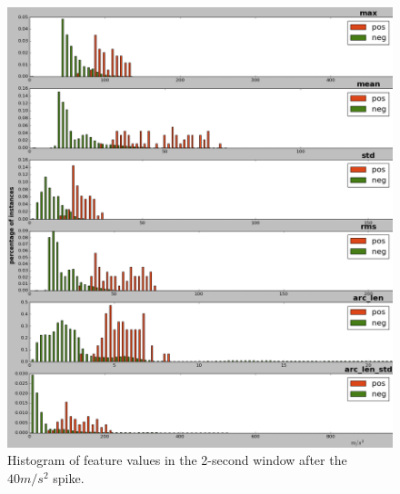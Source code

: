 \begin{figure}[t]
\begin{minipage}[t]{0.4\textwidth}
\includegraphics[width=\textwidth]{hist_features_after_win_size_1_2.png}
\caption{Histogram of feature values in the 2-second window after the~$40 m/s^2$ spike.}
\label{fig:afterhist}
\end{minipage}
\end{figure}



